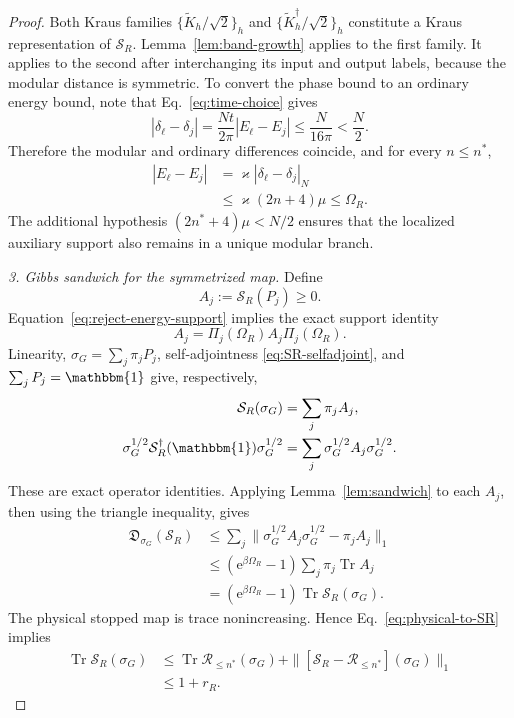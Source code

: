 \documentclass[aps,floatfix,10pt,amssymb,amsmath,superscriptaddress,nofootinbib,longbibliography,nobalancelastpage,twocolumn]{revtex4-2}
\newcommand{\id}{\mathbbm{1}}
\newcommand{\cR}{\mathcal{R}}
\newcommand{\Tr}{\operatorname{Tr}}
\newcommand{\e}{\mathrm{e}}
\begin{document}
\begin{proof}
Both Kraus families
$\{\widetilde K_h/\sqrt2\}_h$ and
$\{\widetilde K_h^\dagger/\sqrt2\}_h$ constitute a Kraus
representation of $\mathcal S_R$.  Lemma~\ref{lem:band-growth} applies
to the first family.  It applies to the second after interchanging its
input and output labels, because the modular distance is symmetric.
To convert the phase bound to an ordinary energy bound, note that
Eq.~\eqref{eq:time-choice} gives
\begin{equation}
 |\delta_\ell-\delta_j|
 =\frac{Nt}{2\pi}|E_\ell-E_j|
 \leq\frac{N}{16\pi}<\frac N2.
 \label{eq:no-energy-wrap}
\end{equation}
Therefore the modular and ordinary differences coincide, and for every
$n\leq n^*$,
\begin{align}
 |E_\ell-E_j|
 &=\varkappa|\delta_\ell-\delta_j|_N\nonumber\\
 &\leq\varkappa(2n+4)\mu
 \leq\Omega_R.
 \label{eq:reject-energy-support}
\end{align}
The additional hypothesis $(2n^*+4)\mu<N/2$ ensures that the
localized auxiliary support also remains in a unique modular branch.

\emph{3. Gibbs sandwich for the symmetrized map.}
Define
\begin{equation}
 A_j:=\mathcal S_R(P_j)\geq0.
 \label{eq:reject-Aj-definition}
\end{equation}
Equation~\eqref{eq:reject-energy-support} implies the exact support
identity
\begin{equation}
 A_j=\Pi_j(\Omega_R)A_j\Pi_j(\Omega_R).
 \label{eq:reject-Aj-support}
\end{equation}
Linearity, $\sigma_G=\sum_j\pi_jP_j$, self-adjointness
\eqref{eq:SR-selfadjoint}, and $\sum_jP_j=\id$ give, respectively,
\begin{align}
 \mathcal S_R(\sigma_G)
 &=\sum_j\pi_jA_j,
 \label{eq:R-forward}\\
 \sigma_G^{1/2}\mathcal S_R^\dagger(\id)\sigma_G^{1/2}
 &=\sum_j\sigma_G^{1/2}A_j\sigma_G^{1/2}.
 \label{eq:R-reverse}
\end{align}
These are exact operator identities.  Applying
Lemma~\ref{lem:sandwich} to each $A_j$, then using the triangle
inequality, gives
\begin{align}
 \mathfrak D_{\sigma_G}(\mathcal S_R)
 &\leq\sum_j
 \|\sigma_G^{1/2}A_j\sigma_G^{1/2}-\pi_jA_j\|_1
 \nonumber\\
 &\leq(\e^{\beta\Omega_R}-1)
 \sum_j\pi_j\Tr A_j\nonumber\\
 &=(\e^{\beta\Omega_R}-1)
 \Tr\mathcal S_R(\sigma_G).
 \label{eq:SR-defect}
\end{align}
The physical stopped map is trace nonincreasing.  Hence
Eq.~\eqref{eq:physical-to-SR} implies
\begin{align}
 \Tr\mathcal S_R(\sigma_G)
 &\leq\Tr\cR_{\leq n^*}(\sigma_G)
 +\|[\mathcal S_R-\cR_{\leq n^*}](\sigma_G)\|_1
 \nonumber\\
 &\leq1+r_R.
 \label{eq:SR-trace}
\end{align}


\end{proof}
\end{document}
